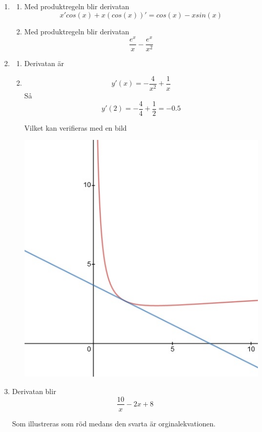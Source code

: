 \documentclass[a4paper,12pt]{article}
\begin{document}
\begin{enumerate}
    \item \begin{enumerate}
        \item Med produktregeln blir derivatan
        $$x'cos(x)+x(cos(x))'=cos(x)-xsin(x)$$

        \item Med produktregeln blir derivatan
        $$\frac{e^x}{x}-\frac{e^x}{x^2}$$
    \end{enumerate}

    \item \begin{enumerate}
        \item Derivatan är 

        \item $$y'(x)=-\frac{4}{x^2}+\frac{1}{x}$$
        Så 
        $$y'(2)=-\frac{4}{4}+\frac{1}{2}=-0.5$$

        Vilket kan verifieras med en bild

        \includegraphics[scale=0.5]{Figur 1.jpg}
    \end{enumerate}

    \item
    Derivatan blir
    $$\frac{10}{x}-2x+8$$

    Som illustreras som röd medans den svarta är orginalekvationen.
    

\end{enumerate}
\end{document}
